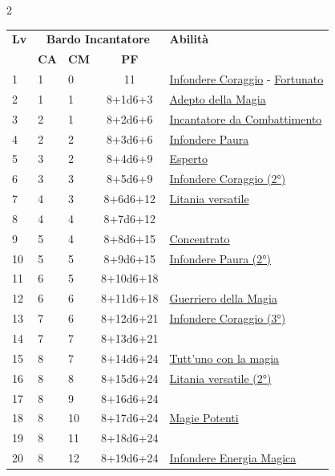 {\begin{multicols}{2}

\noindent\begin{tabularx}{\linewidth}{p{0.55cm}|p{0.55cm}p{0.55cm}c|X|}
	\toprule
 \rowcolor{gray!20}	\textbf{Lv} & \multicolumn{3}{c|}{\textbf{Bardo Incantatore}} & \textbf{Abilità} \\
& \centering\arraybackslash \textbf{CA} & \centering\arraybackslash \textbf{CM} & \centering\arraybackslash \textbf{PF} & \\
	\toprule
	1 & 1 & 0 & 11 & \hyperlink{Infondere Coraggio}{Infondere Coraggio} - \hyperlink{Fortunato}{Fortunato}\\
	\rowcolor{gray!20}2 & 1 & 1 & 8+1d6+3 & \hyperlink{Adepto della Magia}{Adepto della Magia}\\
	3 & 2 & 1 & 8+2d6+6 & \hyperlink{Incantatore da Combattimento}{Incantatore da Combattimento}\\
	\rowcolor{gray!20}4 & 2 & 2 & 8+3d6+6 & \hyperlink{Infondere Paura}{Infondere Paura}\\
	5 & 3 & 2 & 8+4d6+9 & \hyperlink{Esperto}{Esperto}\\
	\rowcolor{gray!20}6 & 3 & 3 & 8+5d6+9 & \hyperlink{Infondere Coraggio}{Infondere Coraggio (2°)}\\
	7 & 4 & 3 & 8+6d6+12 & \hyperlink{Litania versatile}{Litania versatile}\\
	\rowcolor{gray!20}8 & 4 & 4 & 8+7d6+12 & \\
	9 & 5 & 4 & 8+8d6+15 & \hyperlink{Concentrato}{Concentrato}\\
	\rowcolor{gray!20}10 & 5 & 5 & 8+9d6+15 & \hyperlink{Infondere Paura}{Infondere Paura (2°)}\\
	11 & 6 & 5 & 8+10d6+18 & \\
	\rowcolor{gray!20}12 & 6 & 6 & 8+11d6+18 & \hyperlink{Guerriero della Magia}{Guerriero della Magia}\\
	13 & 7 & 6 & 8+12d6+21 & \hyperlink{Infondere Coraggio}{Infondere Coraggio (3°)}\\
	\rowcolor{gray!20}14 & 7 & 7 & 8+13d6+21 & \\
	15 & 8 & 7 & 8+14d6+24 & \hyperlink{Tutt'uno con la magia}{Tutt'uno con la magia}\\
	\rowcolor{gray!20}16 & 8 & 8 & 8+15d6+24 & \hyperlink{Litania versatile}{Litania versatile (2°)}\\
	17 & 8 & 9 & 8+16d6+24 & \\
	\rowcolor{gray!20}18 & 8 & 10 & 8+17d6+24 & \hyperlink{Magie Potenti}{Magie Potenti}\\
	19 & 8 & 11 & 8+18d6+24 & \\
	\rowcolor{gray!20}20 & 8 & 12 & 8+19d6+24 & \hyperlink{Infondere Energia Magica}{Infondere Energia Magica}\\
\end{tabularx}


\end{multicols}}
